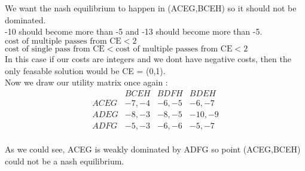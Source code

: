 \begin{latin}
                    \\
                    \\
                    We want the nash equilibrium to happen in (ACEG,BCEH) so it should not be dominated.\\
                    -10 should become more than -5 and -13 should become more than -5.\\
                    $\text{cost of multiple passes from CE} <  2$\\ 
                    $\text{cost of single pass from CE} < \text{cost of multiple passes from CE} <  2$\\ 
                    In this case if our costs are integers and we dont have negative costs, then the only feasable solution would be CE = (0,1).\\
                    Now we draw our utility matrix once again : \\
                    \begin{equation*}
                        \begin{matrix}
                                & BCEH & BDFH & BDEH \\
                               ACEG & -7,-4 & -6,-5  & -6,-7   \\
                               ADEG & -8,-3 & -8,-5 & -10,-9  \\
                               ADFG & -5,-3 & -6,-6 & -5,-7  
                            \end{matrix}
                        \end{equation*}
                        \\ 
                        As we could see, ACEG is weakly dominated by ADFG so point (ACEG,BCEH) could not be a nash equilibrium.
\end{latin}